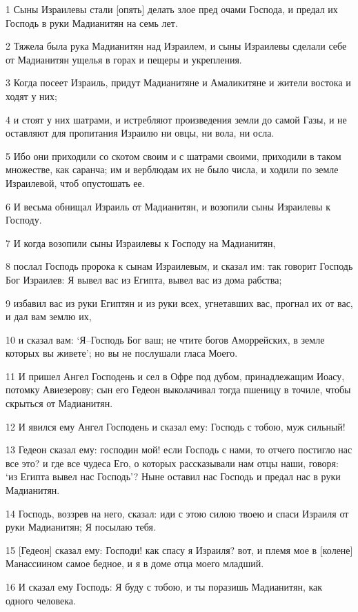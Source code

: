 \par 1 Сыны Израилевы стали [опять] делать злое пред очами Господа, и предал их Господь в руки Мадианитян на семь лет.
\par 2 Тяжела была рука Мадианитян над Израилем, и сыны Израилевы сделали себе от Мадианитян ущелья в горах и пещеры и укрепления.
\par 3 Когда посеет Израиль, придут Мадианитяне и Амаликитяне и жители востока и ходят у них;
\par 4 и стоят у них шатрами, и истребляют произведения земли до самой Газы, и не оставляют для пропитания Израилю ни овцы, ни вола, ни осла.
\par 5 Ибо они приходили со скотом своим и с шатрами своими, приходили в таком множестве, как саранча; им и верблюдам их не было числа, и ходили по земле Израилевой, чтоб опустошать ее.
\par 6 И весьма обнищал Израиль от Мадианитян, и возопили сыны Израилевы к Господу.
\par 7 И когда возопили сыны Израилевы к Господу на Мадианитян,
\par 8 послал Господь пророка к сынам Израилевым, и сказал им: так говорит Господь Бог Израилев: Я вывел вас из Египта, вывел вас из дома рабства;
\par 9 избавил вас из руки Египтян и из руки всех, угнетавших вас, прогнал их от вас, и дал вам землю их,
\par 10 и сказал вам: `Я--Господь Бог ваш; не чтите богов Аморрейских, в земле которых вы живете'; но вы не послушали гласа Моего.
\par 11 И пришел Ангел Господень и сел в Офре под дубом, принадлежащим Иоасу, потомку Авиезерову; сын его Гедеон выколачивал тогда пшеницу в точиле, чтобы скрыться от Мадианитян.
\par 12 И явился ему Ангел Господень и сказал ему: Господь с тобою, муж сильный!
\par 13 Гедеон сказал ему: господин мой! если Господь с нами, то отчего постигло нас все это? и где все чудеса Его, о которых рассказывали нам отцы наши, говоря: `из Египта вывел нас Господь'? Ныне оставил нас Господь и предал нас в руки Мадианитян.
\par 14 Господь, воззрев на него, сказал: иди с этою силою твоею и спаси Израиля от руки Мадианитян; Я посылаю тебя.
\par 15 [Гедеон] сказал ему: Господи! как спасу я Израиля? вот, и племя мое в [колене] Манассиином самое бедное, и я в доме отца моего младший.
\par 16 И сказал ему Господь: Я буду с тобою, и ты поразишь Мадианитян, как одного человека.
